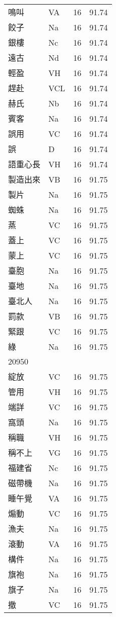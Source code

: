 \documentclass[twocolumn]{book}
\begin{document}
\begin{supertabular}{llrr}
鳴叫 & VA & 16 &  91.74\\
餃子 & Na & 16 &  91.74\\
銀樓 & Nc & 16 &  91.74\\
遠古 & Nd & 16 &  91.74\\
輕盈 & VH & 16 &  91.74\\
趕赴 & VCL & 16 &  91.74\\
赫氏 & Nb & 16 &  91.74\\
賓客 & Na & 16 &  91.74\\
誤用 & VC & 16 &  91.74\\
誤 & D & 16 &  91.74\\
語重心長 & VH & 16 &  91.74\\
製造出來 & VB & 16 &  91.75\\
製片 & Na & 16 &  91.75\\
蜘蛛 & Na & 16 &  91.75\\
蒸 & VC & 16 &  91.75\\
蓋上 & VC & 16 &  91.75\\
蒙上 & VC & 16 &  91.75\\
臺胞 & Na & 16 &  91.75\\
臺地 & Na & 16 &  91.75\\
臺北人 & Na & 16 &  91.75\\
罰款 & VB & 16 &  91.75\\
緊跟 & VC & 16 &  91.75\\
綠 & Na & 16 &  91.75\\
20950\\
綻放 & VC & 16 &  91.75\\
管用 & VH & 16 &  91.75\\
端詳 & VC & 16 &  91.75\\
窩頭 & Na & 16 &  91.75\\
稱職 & VH & 16 &  91.75\\
稱不上 & VG & 16 &  91.75\\
福建省 & Nc & 16 &  91.75\\
磁帶機 & Na & 16 &  91.75\\
睡午覺 & VA & 16 &  91.75\\
煽動 & VC & 16 &  91.75\\
漁夫 & Na & 16 &  91.75\\
滾動 & VA & 16 &  91.75\\
構件 & Na & 16 &  91.75\\
旗袍 & Na & 16 &  91.75\\
旗子 & Na & 16 &  91.75\\
撤 & VC & 16 &  91.75\\

\end{supertabular}
\end{document}

